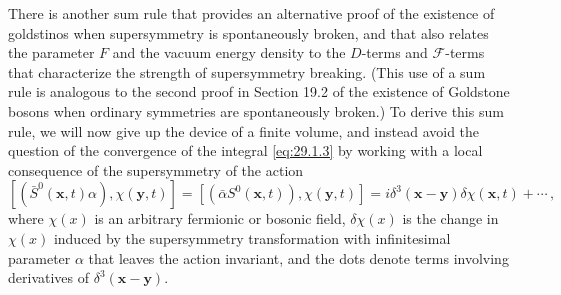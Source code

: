 There is another sum rule that provides an alternative proof of the
existence of goldstinos when supersymmetry is spontaneously broken, and
that also relates the parameter \(F\) and the vacuum energy density to the
\(D\)-terms and \(\mathcal{F}\)-terms that characterize the strength of
supersymmetry breaking. (This use of a sum rule is analogous to the second
proof in Section 19.2 of the existence of Goldstone bosons when ordinary
symmetries are spontaneously broken.) To derive this sum rule, we will now
give up the device of a finite volume, and instead avoid the question of
the convergence of the integral \eqref{eq:29.1.3} by working with a local
consequence of the supersymmetry of the action
\begin{equation}
  \left[(\bar S^0(\mathbf x,t)\alpha),\chi(\mathbf y,t)\right]
  =
  \left[(\bar\alpha S^0(\mathbf x,t)),\chi(\mathbf y,t)\right]
  =
  i\delta^3(\mathbf x-\mathbf y)\delta\chi(\mathbf x,t)+\cdots\,,
  \tag{29.2.11}\label{eq:29.2.11}
\end{equation}
where \(\chi(x)\) is an arbitrary fermionic or bosonic field,
\(\delta\chi(x)\) is the change in \(\chi(x)\) induced by the supersymmetry
transformation with infinitesimal parameter \(\alpha\) that leaves the
action invariant, and the dots denote terms involving derivatives of
\(\delta^3(\mathbf x-\mathbf y)\).

